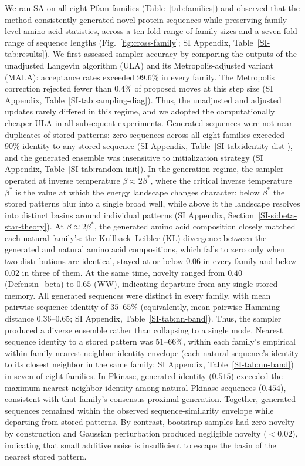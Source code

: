 \documentclass[11pt,onecolumn,twoside,lineno]{pnas-new}
\begin{document}
We ran SA on all eight Pfam families (Table~\ref{tab:families}) and observed that the method consistently generated novel protein sequences while preserving family-level amino acid statistics, across a ten-fold range of family sizes and a seven-fold range of sequence lengths (Fig.~\ref{fig:cross-family}; SI Appendix, Table~\ref{SI-tab:results}). We first assessed sampler accuracy by comparing the outputs of the unadjusted Langevin algorithm (ULA) and its Metropolis-adjusted variant (MALA): acceptance rates exceeded 99.6\% in every family. The Metropolis correction rejected fewer than 0.4\% of proposed moves at this step size (SI Appendix, Table~\ref{SI-tab:sampling-diag}). Thus, the unadjusted and adjusted updates rarely differed in this regime, and we adopted the computationally cheaper ULA in all subsequent experiments. Generated sequences were not near-duplicates of stored patterns: zero sequences across all eight families exceeded 90\% identity to any stored sequence (SI Appendix, Table~\ref{SI-tab:identity-dist}), and the generated ensemble was insensitive to initialization strategy (SI Appendix, Table~\ref{SI-tab:random-init}). In the generation regime, the sampler operated at inverse temperature $\beta \approx 2\beta^*$, where the critical inverse temperature $\beta^*$ is the value at which the energy landscape changes character: below $\beta^*$ the stored patterns blur into a single broad well, while above it the landscape resolves into distinct basins around individual patterns (SI Appendix, Section~\ref{SI-si:beta-star-theory}). At $\beta \approx 2\beta^*$, the generated amino acid composition closely matched each natural family's: the Kullback--Leibler (KL) divergence between the generated and natural amino acid compositions, which falls to zero only when two distributions are identical, stayed at or below $0.06$ in every family and below $0.02$ in three of them. At the same time, novelty ranged from $0.40$ (Defensin\_beta) to $0.65$ (WW), indicating departure from any single stored memory. All generated sequences were distinct in every family, with mean pairwise sequence identity of $35$--$65\%$ (equivalently, mean pairwise Hamming distance $0.36$--$0.65$; SI Appendix, Table~\ref{SI-tab:nn-band}). Thus, the sampler produced a diverse ensemble rather than collapsing to a single mode. Nearest sequence identity to a stored pattern was $51$--$66\%$, within each family's empirical within-family nearest-neighbor identity envelope (each natural sequence's identity to its closest neighbor in the same family; SI Appendix, Table~\ref{SI-tab:nn-band}) in seven of eight families. In Pkinase, generated identity ($0.515$) exceeded the maximum nearest-neighbor identity among natural Pkinase sequences ($0.454$), consistent with that family's consensus-proximal generation. Together, generated sequences remained within the observed sequence-similarity envelope while departing from stored patterns. By contrast, bootstrap samples had zero novelty by construction and Gaussian perturbation produced negligible novelty ($<0.02$), indicating that small additive noise is insufficient to escape the basin of the nearest stored pattern.
\end{document}
